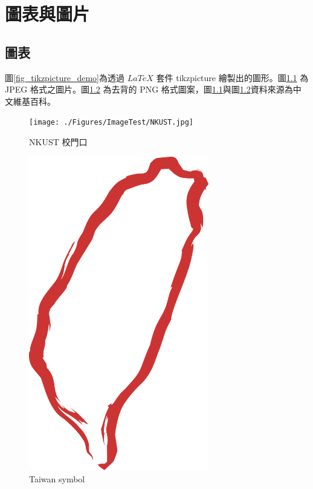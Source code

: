 \chapter{圖表與圖片}\label{Experimental_picture}


\section{圖表}

圖\ref{fig_tikzpicture_demo}為透過 $LaTeX$ 套件 tikzpicture 繪製出的圖形。圖\ref{fig_nkust} 為 JPEG 格式之圖片。圖\ref{fig_taiwan_symbol} 為去背的 PNG 格式圖案，圖\ref{fig_nkust}\cite{nkust_jpg}與圖\ref{fig_taiwan_symbol}\cite{taiwan_symbol}資料來源為中文維基百科。



\begin{figure}[h]
    \centering 
    \texttt{[image: ./Figures/ImageTest/NKUST.jpg]} 
    \caption{NKUST 校門口}
    \label{fig_nkust}
\end{figure}

\begin{figure}[H] 
    \centering 
    \includegraphics[width=0.7\textwidth]{./Figures/ImageTest/Taiwan_symbol.png} 
    \caption{Taiwan symbol}
    \label{fig_taiwan_symbol}
\end{figure}

